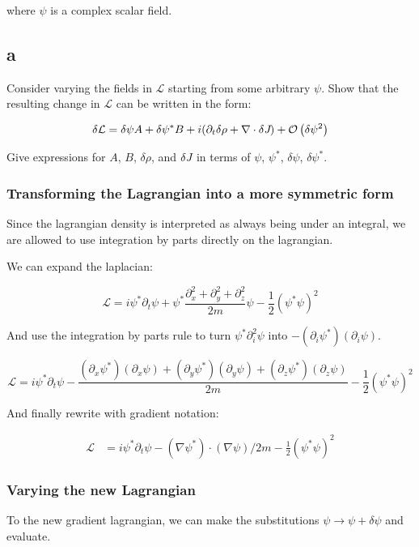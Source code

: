 \documentclass{article}
\newcommand{\Lagr}[0]{\mathcal{L}}
\newcommand{\order}[1]{\mathcal{O}\left( #1 \right)}
\newcommand{\J}[0]{\emph{J}}
\begin{document}
where $\psi$ is a complex scalar field.

\subsection{a}
Consider varying the fields in $\Lagr$ starting from some arbitrary $\psi$.
Show that the resulting change in $\Lagr$ can be written in the form:

\[ \delta \Lagr = \delta \psi A + \delta \psi^* B 
	+ i ( \partial_t \delta \rho + \nabla \cdot \delta \J)
	+ \order{ \delta \psi^2 } \]

Give expressions for $A$, $B$, $\delta \rho$, and $\delta \J$ in terms of $\psi$,
	$\psi^*$, $\delta \psi$, $\delta \psi^*$.


\subsubsection{Transforming the Lagrangian into a more symmetric form}
Since the lagrangian density is interpreted as always being under an integral,
	we are allowed to use integration by parts directly on the lagrangian.

We can expand the laplacian:

\[ \Lagr = i \psi^* \partial_t \psi
	+ \psi^* \frac{\partial_x^2 +\partial_y^2 + \partial_z^2}{2m} \psi 
	- \frac{1}{2} (\psi^* \psi)^2 \]

And use the integration by parts rule to turn $\psi^* \partial_i^2 \psi$ into
	$- (\partial_i \psi^*) (\partial_i \psi)$.

\[ \Lagr = i \psi^* \partial_t \psi
	- \frac{ (\partial_x \psi^*) (\partial_x \psi)
		+  (\partial_y \psi^*) (\partial_y \psi)
		+  (\partial_z \psi^*) (\partial_z \psi)}{2m}
	- \frac{1}{2} (\psi^* \psi)^2 \]

And finally rewrite with gradient notation:

\begin{align}
 \Lagr & = i \psi^* \partial_t \psi
	- ( \nabla \psi^* ) \cdot (\nabla \psi) / 2 m
	- \frac{1}{2} (\psi^* \psi)^2
\end{align}

\subsubsection{Varying the new Lagrangian}

To the new gradient lagrangian, we can make the substitutions $\psi \to \psi + \delta \psi$
	and evaluate.
\end{document}
